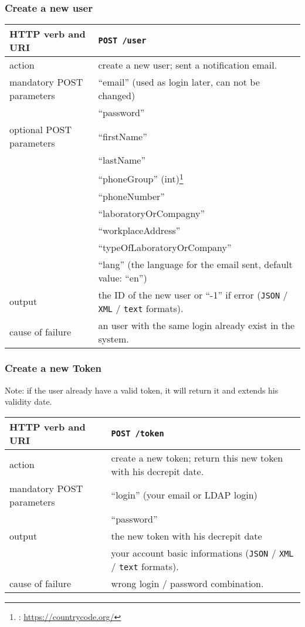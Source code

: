 \subsubsection{Create a new user}
\label{postUser}
\begin{tabular}{ | l | l | }
	\hline
	HTTP verb and URI & \texttt{POST /user} \\
	\hline
	action & create a new user; sent a notification email. \\
	\hline
	mandatory POST parameters & ``email'' (used as login later, can not be changed) \\
	\space & ``password'' \\
	\hline
	optional POST parameters & ``firstName'' \\
	\space & ``lastName''  \\
	\space & ``phoneGroup'' (int)\footnote{\cf: \url{https://countrycode.org/}} \\
	\space & ``phoneNumber'' \\
	\space & ``laboratoryOrCompagny'' \\
	\space & ``workplaceAddress'' \\
	\space & ``typeOfLaboratoryOrCompany'' \\
	\space & ``lang'' (the language for the email sent, default value: ``en'') \\	
	\hline
	output & the ID of the new user or ``-1'' if error (\texttt{JSON} / \texttt{XML} / \texttt{text} formats). \\
	\hline
	cause of failure & an user with the same login already exist in the system. \\
	\hline
\end{tabular}
\newline

\subsubsection{Create a new Token}
\label{postToken}
Note: if the user already have a valid token, it will return it and extends his validity date. \\
\begin{tabular}{ | l | l | }
	\hline
	HTTP verb and URI & \texttt{POST /token} \\
	\hline
	action & create a new token; return this new token with his decrepit date. \\
	\hline
	mandatory POST parameters & ``login'' (your email or LDAP login) \\
	\space & ``password'' \\
	\hline
	output & the new token with his decrepit date \\
	\space & your account basic informations (\texttt{JSON} / \texttt{XML} / \texttt{text} formats). \\
	\hline
	cause of failure & wrong login / password combination. \\
	\hline
\end{tabular}
\newline

